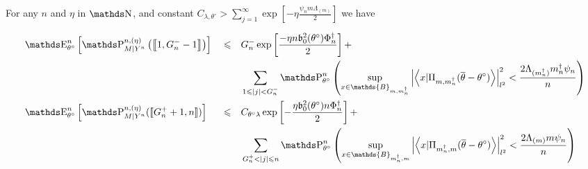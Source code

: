 \begin{pr}\label{PRD.5.3}
For any $n$ and $\eta$ in $\N$, and constant $C_{\lambda, \theta^{\circ}} > \sum\limits_{j = 1}^{\infty} \exp\left[- \eta \frac{\psi_{n} m \Lambda_{(m)}}{2}\right]$ we have


\begin{alignat}{3}
& \E_{\theta^{\circ}}^{n}\left[\P_{M \vert Y^{n}}^{n, (\eta)}\left(\left\llbracket 1, G^{-}_{n} - 1 \right\rrbracket\right)\right] && \leq && G^{-}_{n}\exp\left[\frac{- \eta n \mathfrak{b}_{0}^{2}(\theta^{\circ}) \Phi^{\dagger}_{n}}{2}\right] +\notag\\
& && && \sum\limits_{1 \leq \vert j \vert < G^{-}_{n}}\P_{\theta^{\circ}}^{n}\left(\sup\limits_{x \in \mathds{B}_{m, m^{\dagger}_{n}}} \left\vert \left\langle x \vert \Pi_{m, m^{\dagger}_{n}} (\overline{\theta} - \theta^{\circ}) \right\rangle \right\vert_{l^{2}}^{2} < \frac{2 \Lambda_{(m^{\dagger}_{n})} m^{\dagger}_{n} \psi_{n}}{n}\right)\label{EQD.28}\\
& \E_{\theta^{\circ}}^{n}\left[\P_{M \vert Y^{n}}^{n, (\eta)}(\llbracket G^{+}_{n} + 1, n \rrbracket)\right] && \leq && C_{\theta^{\circ} \lambda} \exp \left[-\frac{\eta \mathfrak{b}_{0}^{2}(\theta^{\circ}) n \Phi^{\dagger}_{n}}{2}\right] +\notag\\
& && && \sum\limits_{G^{+}_{n} < \vert j \vert \leq n}\P_{\theta^{\circ}}^{n}\left(\sup\limits_{x \in \mathds{B}_{m^{\dagger}_{n}, m}} \left\vert \left\langle x \vert \Pi_{m^{\dagger}_{n}, m} (\overline{\theta} - \theta^{\circ}) \right\rangle \right\vert_{l^{2}}^{2} < \frac{2 \Lambda_{(m)} m \psi_{n}}{n}\right)\label{EQD.29}
\end{alignat}
\end{pr}

